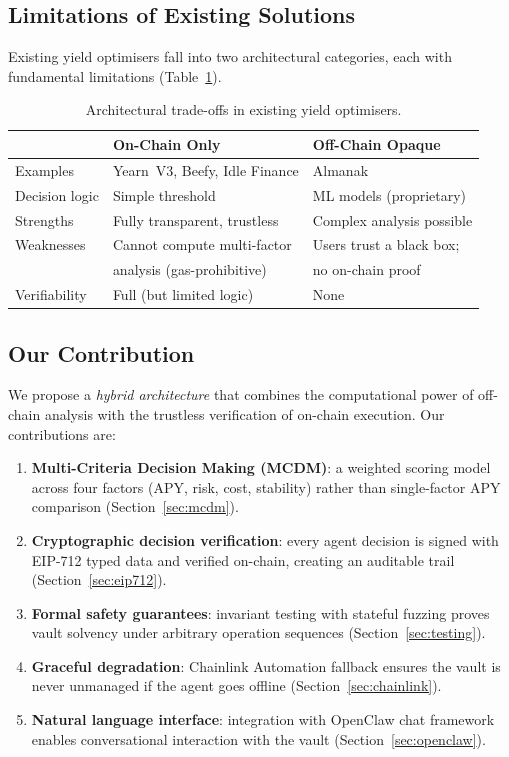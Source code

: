 \documentclass[12pt]{article}
\begin{document}
\subsection{Limitations of Existing Solutions}

Existing yield optimisers fall into two architectural categories, each with fundamental limitations (Table~\ref{tab:existing-limitations}).

\begin{table}[H]
\centering
\caption{Architectural trade-offs in existing yield optimisers.}
\label{tab:existing-limitations}
\small
\begin{tabular}{@{}lll@{}}
\toprule
 & \textbf{On-Chain Only} & \textbf{Off-Chain Opaque} \\
\midrule
Examples       & Yearn~V3, Beefy, Idle Finance & Almanak \\
Decision logic & Simple threshold           & ML models (proprietary) \\
Strengths      & Fully transparent, trustless & Complex analysis possible \\
Weaknesses     & Cannot compute multi-factor  & Users trust a black box; \\
               & analysis (gas-prohibitive)   & no on-chain proof \\
Verifiability  & Full (but limited logic)     & None \\
\bottomrule
\end{tabular}
\end{table}

\subsection{Our Contribution}

We propose a \emph{hybrid architecture} that combines the computational power of off-chain analysis with the trustless verification of on-chain execution.
Our contributions are:

\begin{enumerate}[nosep]
  \item \textbf{Multi-Criteria Decision Making (MCDM)}: a weighted scoring model across four factors (APY, risk, cost, stability) rather than single-factor APY comparison (Section~\ref{sec:mcdm}).
  \item \textbf{Cryptographic decision verification}: every agent decision is signed with EIP-712 typed data and verified on-chain, creating an auditable trail (Section~\ref{sec:eip712}).
  \item \textbf{Formal safety guarantees}: invariant testing with stateful fuzzing proves vault solvency under arbitrary operation sequences (Section~\ref{sec:testing}).
  \item \textbf{Graceful degradation}: Chainlink Automation fallback ensures the vault is never unmanaged if the agent goes offline (Section~\ref{sec:chainlink}).
  \item \textbf{Natural language interface}: integration with OpenClaw chat framework enables conversational interaction with the vault (Section~\ref{sec:openclaw}).
\end{enumerate}
\end{document}
